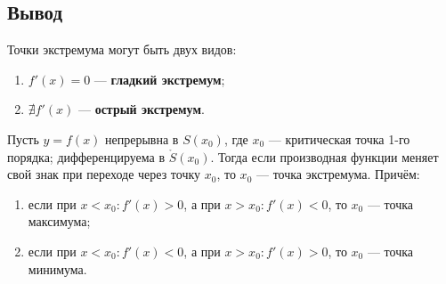 \subsection*{Вывод}
Точки экстремума могут быть двух видов:
\begin{enumerate}
	\item $f'(x) = 0$ --- \textbf{гладкий экстремум};
	\item $\nexists f'(x)$ --- \textbf{острый экстремум}.
\end{enumerate}
\begin{theorem}
	Пусть $y=f(x)$ непрерывна в $S(x_0)$, где $x_0$ --- критическая точка 1-го порядка; дифференцируема в $\mathring{S}(x_0)$. Тогда если производная функции меняет свой знак при переходе через точку $x_0$, то $x_0$ --- точка экстремума. Причём:
	\begin{enumerate}
		\item если при $x < x_0\colon f'(x) > 0$, а при $x > x_0\colon f'(x) < 0$, то $x_0$ --- точка максимума;
		\item если при $x < x_0\colon f'(x) < 0$, а при $x > x_0\colon f'(x) > 0$, то $x_0$ --- точка минимума.
	\end{enumerate}
\end{theorem}
